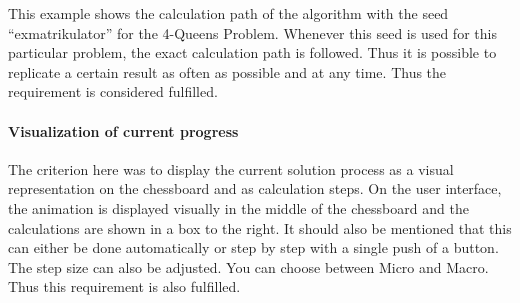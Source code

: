 This example shows the calculation path of the algorithm with the seed \enquote{exmatrikulator} for the 4-Queens Problem. Whenever this seed is used for this particular problem, the exact calculation path is followed. Thus it is possible to replicate a certain result as often as possible and at any time. Thus the requirement is considered fulfilled.
\paragraph{Visualization of current progress}
The criterion here was to display the current solution process as a visual representation on the chessboard and as calculation steps. On the user interface, the animation is displayed visually in the middle of the chessboard and the calculations are shown in a box to the right. It should also be mentioned that this can either be done automatically or step by step with a single push of a button. The step size can also be adjusted. You can choose between Micro and Macro. Thus this requirement is also fulfilled.
